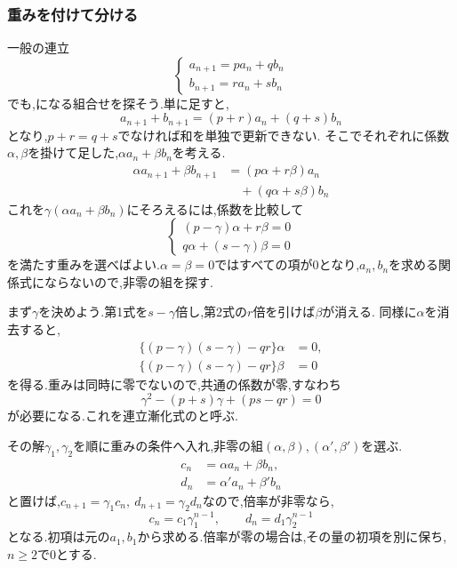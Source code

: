   \subsubsection{重みを付けて分ける}
    一般の連立
    \[
      \begin{cases}
        a_{n+1}=pa_n+qb_n\\
        b_{n+1}=ra_n+sb_n
      \end{cases}
    \]
    でも,になる組合せを探そう.単に足すと,
    \[
      a_{n+1}+b_{n+1}=(p+r)a_n+(q+s)b_n
    \]
    となり,$p+r=q+s$でなければ和を単独で更新できない.
    そこでそれぞれに係数$\alpha,\beta$を掛けて足した,$\alpha a_n+\beta b_n$を考える.
    \[
      \begin{aligned}
        \alpha a_{n+1}+\beta b_{n+1}
          &=(p\alpha+r\beta)a_n\\
          &\quad+(q\alpha+s\beta)b_n
      \end{aligned}
    \]
    これを$\gamma(\alpha a_n+\beta b_n)$にそろえるには,係数を比較して
    \[
      \begin{cases}
        (p-\gamma)\alpha+r\beta=0\\
        q\alpha+(s-\gamma)\beta=0
      \end{cases}
    \]
    を満たす重みを選べばよい.$\alpha=\beta=0$ではすべての項が$0$となり,$a_n,b_n$を求める関係式にならないので,非零の組を探す.

    まず$\gamma$を決めよう.第1式を$s-\gamma$倍し,第2式の$r$倍を引けば$\beta$が消える.
    同様に$\alpha$を消去すると,
    \begin{align*}
      \{(p-\gamma)(s-\gamma)-qr\}\alpha&=0,\\
      \{(p-\gamma)(s-\gamma)-qr\}\beta&=0
    \end{align*}
    を得る.重みは同時に零でないので,共通の係数が零,すなわち
    \[
      \gamma^2-(p+s)\gamma+(ps-qr)=0
    \]
    が必要になる.これを連立漸化式のと呼ぶ.

    その解$\gamma_1,\gamma_2$を順に重みの条件へ入れ,非零の組$(\alpha,\beta),(\alpha',\beta')$を選ぶ.
    \begin{align*}
      c_n&=\alpha a_n+\beta b_n,\\
      d_n&=\alpha'a_n+\beta'b_n
    \end{align*}
    と置けば,$c_{n+1}=\gamma_1c_n,\ d_{n+1}=\gamma_2d_n$なので,倍率が非零なら,
    \[
      c_n=c_1\gamma_1^{n-1},\qquad
      d_n=d_1\gamma_2^{n-1}
    \]
    となる.初項は元の$a_1,b_1$から求める.倍率が零の場合は,その量の初項を別に保ち,$n\ge2$で$0$とする.

